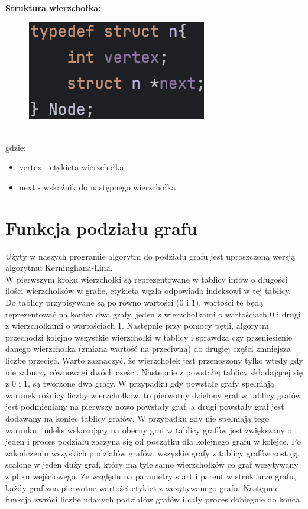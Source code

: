 \documentclass{article}
\begin{document}
\textbf{Struktura wierzchołka:}\\
\begin{figure}[ht]
  \includegraphics[]{img/node.png}
\end{figure}\\
gdzie:
\begin{itemize}
    \item vertex - etykieta wierzchołka
    \item next - wskaźnik do następnego wierzchołka
\end{itemize}

\newpage

\section*{Funkcja podziału grafu}
Użyty w naszych programie algorytm do podziału grafu jest uproszczoną wersją algorytmu Kerninghana-Lina. \\
W pierwszym kroku wierzchołki są reprezentowane w tablicy intów o długości ilości wierzchołków w grafie, etykieta węzła odpowiada indeksowi w tej tablicy. Do tablicy przypisywane są po równo wartości (0 i 1), wartości te będą reprezentować na koniec dwa grafy, jeden z wierzchołkami o wartościach 0 i drugi z wierzchołkami o wartościach 1. Następnie przy pomocy pętli, algorytm przechodzi kolejno wszystkie wierzchołki w tablicy i sprawdza czy przeniesienie danego wierzchołka (zmiana wartość na przeciwną) do drugiej części zmniejsza liczbę przecięć. Warto zaznaczyć, że wierzchołek jest przenoszony tylko wtedy gdy nie zaburzy równowagi dwóch części. Następnie z powstałej tablicy składającej się z 0 i 1, są tworzone dwa grafy. W przypadku gdy powstałe grafy spełniają warunek różnicy liczby wierzchołków, to pierwotny dzielony graf w tablicy grafów jest podmieniany na pierwszy nowo powstały graf, a drugi powstały graf jest dodawany na koniec tablicy grafów. W przypadku gdy nie spełniają tego warunku, indeks wskazujący na obecny graf w tablicy grafów jest zwiększany o jeden i proces podziału zaczyna się od początku dla kolejnego grafu w kolejce. Po zakończeniu wszyskich podziałów grafów, wszyskie grafy z tablicy grafów zostają scalone w jeden duży graf, który ma tyle samo wierzchołków co graf wczytywany z pliku wejściowego. Ze względu na parametry start i parent w strukturze grafu, każdy graf zna pierwotne wartości etykiet z wczytywanego grafu. Następnie funkcja zwróci liczbę udanych podziałów grafów i cały proces dobiegnie do końca. 
\end{document}
